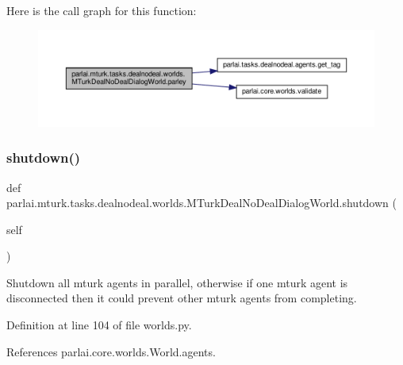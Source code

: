 Here is the call graph for this function\+:
\nopagebreak
\begin{figure}[H]
\begin{center}
\leavevmode
\includegraphics[width=350pt]{classparlai_1_1mturk_1_1tasks_1_1dealnodeal_1_1worlds_1_1MTurkDealNoDealDialogWorld_af7190231afe42d1e3a8eefaf4ef16b19_cgraph}
\end{center}
\end{figure}
\mbox{\label{classparlai_1_1mturk_1_1tasks_1_1dealnodeal_1_1worlds_1_1MTurkDealNoDealDialogWorld_ae4c0bea3e503b59221117b2cc1dc7ce3}} 
\subsubsection{\texorpdfstring{shutdown()}{shutdown()}}
{\footnotesize\ttfamily def parlai.\+mturk.\+tasks.\+dealnodeal.\+worlds.\+M\+Turk\+Deal\+No\+Deal\+Dialog\+World.\+shutdown (\begin{DoxyParamCaption}\item[{}]{self }\end{DoxyParamCaption})}

\begin{DoxyVerb}Shutdown all mturk agents in parallel, otherwise if one mturk agent
is disconnected then it could prevent other mturk agents from
completing.
\end{DoxyVerb}
 

Definition at line 104 of file worlds.\+py.



References parlai.\+core.\+worlds.\+World.\+agents.



